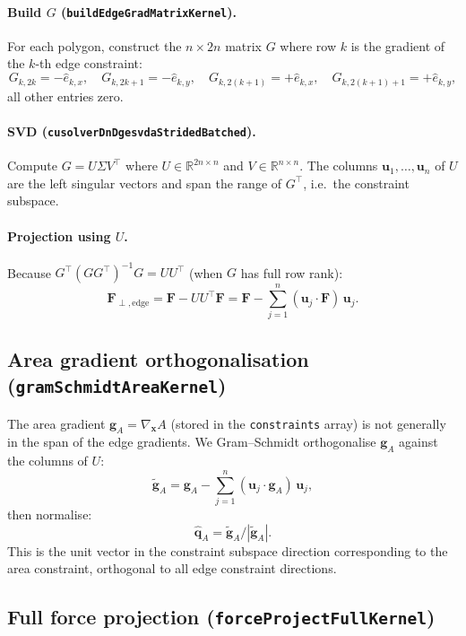 \documentclass[12pt]{article}
\newcommand{\R}{\mathbb{R}}
\begin{document}
\paragraph{Build $G$ (\texttt{buildEdgeGradMatrixKernel}).}
For each polygon, construct the $n \times 2n$ matrix $G$ where row $k$ is the
gradient of the $k$-th edge constraint:
\[
  G_{k, 2k}   = -\hat e_{k,x}, \quad G_{k, 2k+1} = -\hat e_{k,y}, \quad
  G_{k, 2(k+1)} = +\hat e_{k,x}, \quad G_{k, 2(k+1)+1} = +\hat e_{k,y},
\]
all other entries zero.

\paragraph{SVD (\texttt{cusolverDnDgesvdaStridedBatched}).}
Compute $G = U \Sigma V^\top$ where $U \in \R^{2n\times n}$ and $V \in \R^{n\times n}$.
The columns $\mathbf{u}_1,\ldots,\mathbf{u}_n$ of $U$ are the left singular vectors
and span the range of $G^\top$, i.e.\ the constraint subspace.

\paragraph{Projection using $U$.}
Because $G^\top(G G^\top)^{-1}G = U U^\top$ (when $G$ has full row rank):
\[
  \mathbf{F}_{\perp,\mathrm{edge}} = \mathbf{F} - U U^\top \mathbf{F}
  = \mathbf{F} - \sum_{j=1}^n (\mathbf{u}_j \cdot \mathbf{F})\,\mathbf{u}_j.
\]

\subsection{Area gradient orthogonalisation (\texttt{gramSchmidtAreaKernel})}

The area gradient $\mathbf{g}_A = \nabla_\mathbf{x} A$ (stored in the \texttt{constraints}
array) is not generally in the span of the edge gradients.  We Gram–Schmidt orthogonalise
$\mathbf{g}_A$ against the columns of $U$:
\[
  \tilde{\mathbf{g}}_A = \mathbf{g}_A - \sum_{j=1}^n (\mathbf{u}_j \cdot \mathbf{g}_A)\,\mathbf{u}_j,
\]
then normalise:
\[
  \hat{\mathbf{q}}_A = \tilde{\mathbf{g}}_A / |\tilde{\mathbf{g}}_A|.
\]
This is the unit vector in the constraint subspace direction corresponding to the area
constraint, orthogonal to all edge constraint directions.

\subsection{Full force projection (\texttt{forceProjectFullKernel})}
\end{document}
